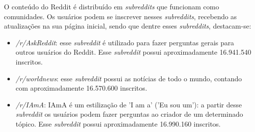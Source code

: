 O conteúdo do Reddit é distribuído em \textit{subreddits} que funcionam como
comunidades. Os usuários podem se inscrever nesses
\textit{subreddits}, recebendo as atualizações na sua página inicial, sendo
que dentre esses \textit{subreddits}, destacam-se:


\begin{itemize}
  \item \textit{/r/AskReddit}: esse \textit{subreddit} é utilizado para fazer
  perguntas gerais para outros usuários do Reddit. Esse \textit{subreddit}
  possui aproximadamente 16.941.540 inscritos.
  \item \textit{/r/worldnews}: esse \textit{subreddit} possui as notícias de
  todo o mundo, contando com aproximadamente 16.570.600 inscritos.
  \item \textit{/r/IAmA}: IAmA é um estilização de 'I am a' ('Eu sou um'):
  a partir desse \textit{subreddit} os usuários podem fazer perguntas ao criador
  de um determinado tópico. Esse \textit{subreddit} possui aproximadamente
  16.990.160 inscritos.
\end{itemize}

% 


